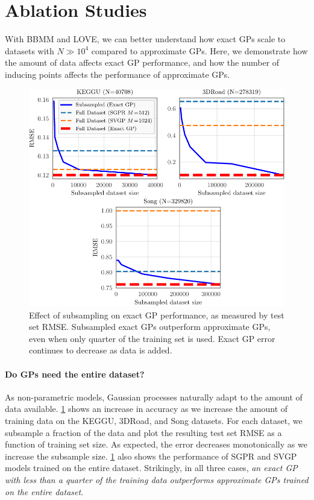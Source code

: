 \section{Ablation Studies}
With BBMM and LOVE, we can better understand how exact GPs scale to datasets with $N\gg 10^4$ compared to approximate GPs.
Here, we demonstrate how the amount of data affects exact GP performance, and how the number of inducing points affects the performance of approximate GPs.

\begin{figure}[t!]
  \centering
  \includegraphics[width=0.7\linewidth]{figures/subsampling.pdf}
  \caption[Effect of subsampling on exact GP performance.]{
    Effect of subsampling on exact GP performance, as measured by test set RMSE.
    Subsampled exact GPs outperform approximate GPs, even when only quarter of the training set is used.
    Exact GP error continues to decrease as data is added.
  }
  \label{fig:subsampling_results}
\end{figure}

\paragraph{Do GPs need the entire dataset?}
As non-parametric models, Gaussian processes naturally adapt to the amount of data available.
\cref{fig:subsampling_results} shows an increase in accuracy as we increase the amount of training data on the KEGGU, 3DRoad, and Song datasets.
For each dataset, we subsample a fraction of the data and plot the resulting test set RMSE as a function of training set size.
As expected, the error decreases monotonically as we increase the subsample size.
\cref{fig:subsampling_results} also shows the performance of SGPR and SVGP models trained on the entire dataset.
Strikingly, in all three cases, \textit{an exact GP with less than a quarter of the training data outperforms approximate GPs trained on the entire dataset}.

